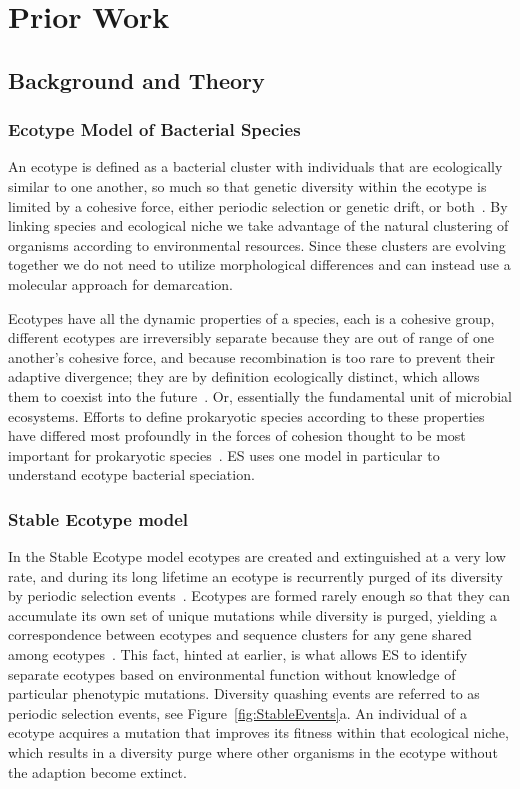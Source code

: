 \chapter{Prior Work}
\section{Background and Theory}
\subsection{Ecotype Model of Bacterial Species}
An ecotype is defined as a bacterial cluster with individuals that are ecologically similar to one another, so much so that genetic diversity within the ecotype is limited by a cohesive force, either periodic selection or genetic drift, or both~\cite{cohan2007systematics}.
By linking species and ecological niche we take advantage of the natural clustering of organisms according to environmental resources.
Since these clusters are evolving together we do not need to utilize morphological differences and can instead use a molecular approach for demarcation.

Ecotypes have all the dynamic properties of a species, each is a cohesive group, different ecotypes are irreversibly separate because they are out of range of one another's cohesive force, and because recombination is too rare to prevent their adaptive divergence; they are by definition ecologically distinct, which allows them to coexist into the future~\cite{cohan2007systematics}.
Or, essentially the fundamental unit of microbial ecosystems.
Efforts to define prokaryotic species according to these properties have differed most profoundly in the forces of cohesion thought to be most important for prokaryotic species~\cite{cohan2008origins}.
ES uses one model in particular to understand ecotype bacterial speciation.

\subsection{Stable Ecotype model}
In the Stable Ecotype model ecotypes are created and extinguished at a very low rate, and during its long lifetime an ecotype is recurrently purged of its diversity by periodic selection events~\cite{cohan2007systematics}.
Ecotypes are formed rarely enough so that they can accumulate its own set of unique mutations while diversity is purged, yielding a correspondence between ecotypes and sequence clusters for any gene shared among ecotypes~\cite{cohan2008origins}.
This fact, hinted at earlier, is what allows ES to identify separate ecotypes based on environmental function without knowledge of particular phenotypic mutations.
Diversity quashing events are referred to as periodic selection events, see Figure~\ref{fig:StableEvents}a.
An individual of a ecotype acquires a mutation that improves its fitness within that ecological niche, which results in a diversity purge where other organisms in the ecotype without the adaption become extinct.

